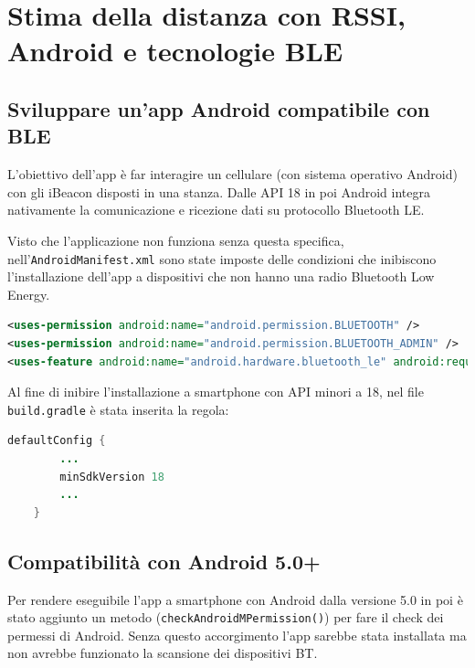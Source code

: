 \chapter{Stima della distanza con RSSI, Android e tecnologie BLE}

\section{Sviluppare un'app Android compatibile con BLE}
L'obiettivo dell'app è far interagire un cellulare (con sistema operativo Android) con gli iBeacon disposti in una stanza. Dalle API 18 in poi Android integra nativamente la comunicazione e ricezione dati su protocollo Bluetooth LE.

Visto che l'applicazione non funziona senza questa specifica, nell'\texttt{AndroidManifest.xml} sono state imposte delle condizioni che inibiscono l'installazione dell'app a dispositivi che non hanno una radio Bluetooth Low Energy.

\begin{lstlisting}[language=XML]
<uses-permission android:name="android.permission.BLUETOOTH" />
<uses-permission android:name="android.permission.BLUETOOTH_ADMIN" />
<uses-feature android:name="android.hardware.bluetooth_le" android:required="true" />
\end{lstlisting}

Al fine di inibire l'installazione a smartphone con API minori a 18, nel file \texttt{build.gradle} è stata inserita la regola:
\begin{lstlisting}[language=Java]
    defaultConfig {
    	...
    	minSdkVersion 18
    	...
    }
\end{lstlisting}

\section{Compatibilità con Android 5.0+}
Per rendere eseguibile l'app a smartphone con Android dalla versione 5.0 in poi è stato aggiunto un metodo (\texttt{checkAndroidMPermission()}) per fare il check dei permessi di Android. Senza questo accorgimento l'app sarebbe stata installata ma non avrebbe funzionato la scansione dei dispositivi BT.

